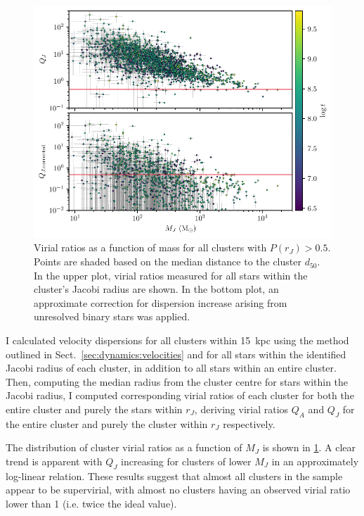 \begin{figure}[t]
    \centering
    \includegraphics[width=\textwidth]{fig/c4/results_virial_vs_mass.pdf}
    \caption[Virial ratios as a function of mass for all clusters with $P(r_J) > 0.5$]{Virial ratios as a function of mass for all clusters with $P(r_J) > 0.5$. Points are shaded based on the median distance to the cluster $d_{50}$. In the upper plot, virial ratios measured for all stars within the cluster's Jacobi radius are shown. In the bottom plot, an approximate correction for dispersion increase arising from unresolved binary stars was applied.}
    \label{fig:dynamics:results:virial_vs_mass}
\end{figure}

I calculated velocity dispersions for all clusters within 15~kpc using the method outlined in Sect.~\ref{sec:dynamics:velocities} and for all stars within the identified Jacobi radius of each cluster, in addition to all stars within an entire cluster. Then, computing the median radius from the cluster centre for stars within the Jacobi radius, I computed corresponding virial ratios of each cluster for both the entire cluster and purely the stars within $r_J$, deriving virial ratios $Q_A$ and $Q_J$ for the entire cluster and purely the cluster within $r_J$ respectively.

The distribution of cluster virial ratios as a function of $M_J$ is shown in \ref{fig:dynamics:results:virial_vs_mass}. A clear trend is apparent with $Q_J$ increasing for clusters of lower $M_J$ in an approximately log-linear relation. These results suggest that almost all clusters in the sample appear to be supervirial, with almost no clusters having an observed virial ratio lower than 1 (i.e. twice the ideal value).

